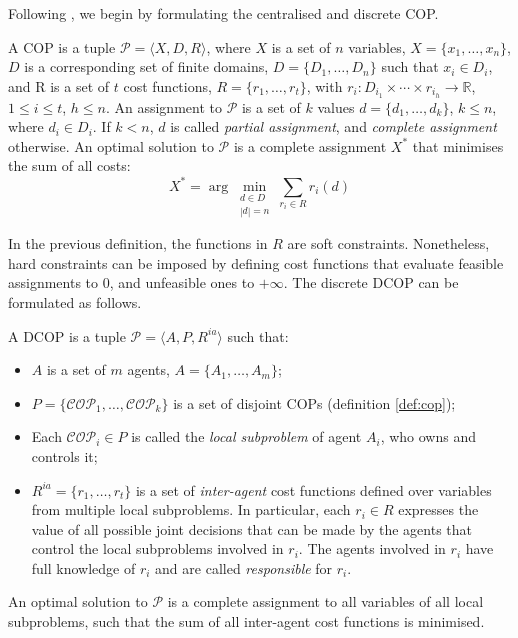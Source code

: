 Following \cite[Section $2.1$]{petcu2007thesis}, we begin by formulating the centralised
and discrete COP.
\begin{definition}\label{def:cop}
    A COP is a tuple $\mathcal{P} = \langle X, D, R \rangle$, where $X$ is a set of $n$
    variables, $X = \{x_1, \dots, x_n\}$, $D$ is a corresponding set of finite domains, $D
    = \{D_1, \dots, D_n\}$ such that $x_i \in D_i$, and R is a set of $t$ cost functions,
    $R = \{r_1, \dots, r_t\}$, with $r_i : D_{i_1} \times \cdots \times r_{i_h} \to
    \mathbb{R}$, $1 \leq i \leq t$, $h \leq n$.
    An assignment to $\mathcal{P}$ is a set of $k$ values $d = \{d_1, \dots, d_k \}$, $k
    \leq n$, where $d_i \in D_i$. If $k < n$, $d$ is called \emph{partial assignment}, and
    \emph{complete assignment} otherwise. An optimal solution to $\mathcal{P}$ is a
    complete assignment $X^\ast$ that minimises the sum of all costs:
    \begin{equation}
        X^\ast = \arg \min_{\substack{d \in D\\ |d| = n}} \sum_{r_i \in R} r_i(d)
    \end{equation}
\end{definition}
In the previous definition, the functions in $R$ are soft constraints. Nonetheless, hard
constraints can be imposed by defining cost functions that evaluate feasible assignments
to $0$, and unfeasible ones to $+\infty$. The discrete DCOP can be formulated as follows.
\begin{definition}\label{def:dcop}
    A DCOP is a tuple $\mathcal{P} = \langle A, P, R^{ia} \rangle$ such that:
    \begin{itemize}
        \item $A$ is a set of $m$ agents, $A = \{ A_1, \dots, A_m \}$;
        \item $P = \{\mathcal{COP}_1, \dots, \mathcal{COP}_k\}$ is a set of disjoint COPs
            (definition \ref{def:cop});
        \item Each $\mathcal{COP}_i \in P$ is called the \emph{local subproblem} of agent
            $A_i$, who owns and controls it;
        \item $R^{ia} = \{ r_1, \dots, r_t \}$ is a set of \emph{inter-agent} cost
            functions defined over variables from multiple local subproblems. In
            particular, each $r_i \in R$ expresses the value of all possible joint
            decisions that can be made by the agents that control the local subproblems
            involved in $r_i$. The agents involved in $r_i$ have full knowledge of $r_i$
            and are called \emph{responsible} for $r_i$.
    \end{itemize}
    An optimal solution to $\mathcal{P}$ is a complete assignment to all variables of all
    local subproblems, such that the sum of all inter-agent cost functions is minimised.
\end{definition}
